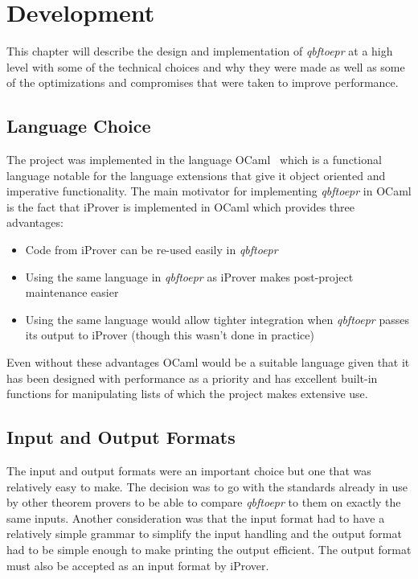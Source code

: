 \chapter{Development}
This chapter will describe the design and implementation of \textit{qbftoepr} at a high level with some of the technical choices and why they were made as well as some of the optimizations and compromises that were taken to improve performance.

\section{Language Choice}
The project was implemented in the language OCaml~\cite{ocaml} which is a functional language notable for the language extensions that give it object oriented and imperative functionality. The main motivator for implementing \textit{qbftoepr} in OCaml is the fact that iProver is implemented in OCaml which provides three advantages:

\begin{itemize}
\item Code from iProver can be re-used easily in \textit{qbftoepr}\\
\item Using the same language in \textit{qbftoepr} as iProver makes post-project maintenance easier\\
\item Using the same language would allow tighter integration when \textit{qbftoepr} passes its output to iProver (though this wasn't done in practice)\\
\end{itemize}

Even without these advantages OCaml would be a suitable language given that it has been designed with performance as a priority and has excellent built-in functions for manipulating lists of which the project makes extensive use.

\section{Input and Output Formats}
The input and output formats were an important choice but one that was relatively easy to make. The decision was to go with the standards already in use by other theorem provers to be able to compare \textit{qbftoepr} to them on exactly the same inputs. Another consideration was that the input format had to have a relatively simple grammar to simplify the input handling and the output format had to be simple enough to make printing the output efficient. The output format must also be accepted as an input format by iProver.

